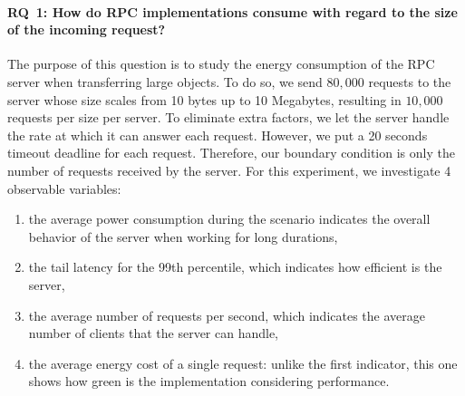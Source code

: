 \paragraph{\textsc{RQ}~1: How do RPC implementations consume with regard to the size of the incoming request?}

The purpose of this question is to study the energy consumption of the RPC server when transferring large objects.
To do so, we send $80,000$ requests to the server whose size scales from 10 bytes up to 10 Megabytes, resulting in $10,000$ requests per size per server.
To eliminate extra factors, we let the server handle the rate at which it can answer each request.
However, we put a 20 seconds timeout deadline for each request.
Therefore, our boundary condition is only the number of requests received by the server.
For this experiment, we investigate 4 observable variables:
\begin{enumerate}
    \item the \textsf{average power consumption} during the scenario indicates the overall behavior of the server when working for long durations,
    \item the \textsf{tail latency} for the 99th percentile, which indicates how efficient is the server,
    \item the \textsf{average number of requests per second}, which indicates the average number of clients that the server can handle,
    \item the \textsf{average energy cost} of a single request: unlike the first indicator, this one shows how green is the implementation considering performance.
\end{enumerate}


